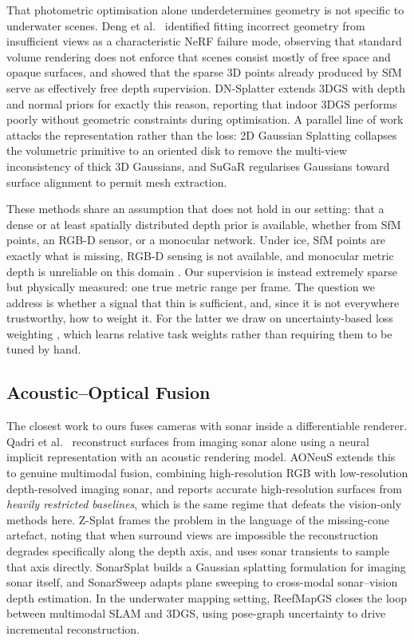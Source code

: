 \documentclass[conference]{IEEEtran}
\begin{document}
That photometric optimisation alone underdetermines geometry is not specific to
underwater scenes. Deng et al.\ \cite{deng2022dsnerf} identified fitting
incorrect geometry from insufficient views as a characteristic NeRF failure
mode, observing that standard volume rendering does not enforce that scenes
consist mostly of free space and opaque surfaces, and showed that the sparse
3D points already produced by SfM serve as effectively free depth supervision.
DN-Splatter \cite{turkulainen2025dnsplatter} extends 3DGS with depth and normal
priors for exactly this reason, reporting that indoor 3DGS performs poorly
without geometric constraints during optimisation. A parallel line of work
attacks the representation rather than the loss: 2D Gaussian Splatting
\cite{huang20242dgs} collapses the volumetric primitive to an oriented disk to
remove the multi-view inconsistency of thick 3D Gaussians, and SuGaR
\cite{guedon2024sugar} regularises Gaussians toward surface alignment to permit
mesh extraction.

These methods share an assumption that does not hold in our setting: that a
dense or at least spatially distributed depth prior is available, whether from
SfM points, an RGB-D sensor, or a monocular network. Under ice, SfM points are
exactly what is missing, RGB-D sensing is not available, and monocular metric
depth is unreliable on this domain \cite{cai-2025, wu2025stereoadapteradaptingstereodepth}.
Our supervision is instead extremely sparse but physically measured: one true
metric range per frame. The question we address is whether a signal that thin
is sufficient, and, since it is not everywhere trustworthy, how to weight it.
For the latter we draw on uncertainty-based loss weighting
\cite{kendall2018uncertainty}, which learns relative task weights rather than
requiring them to be tuned by hand.

\subsection{Acoustic--Optical Fusion}

The closest work to ours fuses cameras with sonar inside a differentiable
renderer. Qadri et al.\ \cite{qadri2023neusis} reconstruct surfaces from
imaging sonar alone using a neural implicit representation with an acoustic
rendering model. AONeuS \cite{qadri2024aoneus} extends this to genuine
multimodal fusion, combining high-resolution RGB with low-resolution
depth-resolved imaging sonar, and reports accurate high-resolution surfaces
from \emph{heavily restricted baselines}, which is the same regime that defeats
the vision-only methods here. Z-Splat \cite{qu2024zsplat} frames the problem in
the language of the missing-cone artefact, noting that when surround views are
impossible the reconstruction degrades specifically along the depth axis, and
uses sonar transients to sample that axis directly. SonarSplat
\cite{sethuraman2025sonarsplat} builds a Gaussian splatting formulation for
imaging sonar itself, and SonarSweep \cite{chen2025sonarsweep} adapts plane
sweeping to cross-modal sonar--vision depth estimation. In the underwater
mapping setting, ReefMapGS \cite{yang2026reefmapgs} closes the loop between
multimodal SLAM and 3DGS, using pose-graph uncertainty to drive incremental
reconstruction.
\end{document}
